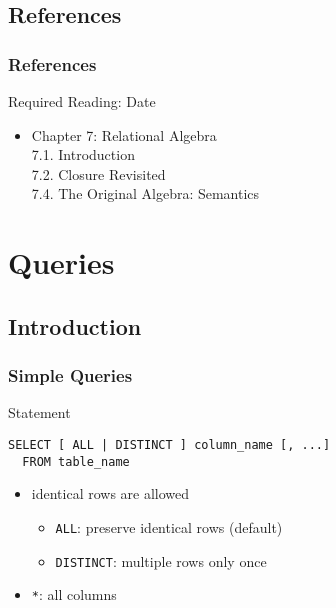 \documentclass[dvipsnames]{beamer}
\theoremstyle{plain}
\begin{document}
\subsection*{References}

\begin{frame}
  \frametitle{References}

  \begin{block}{Required Reading: Date}
    \begin{itemize}
      \item Chapter 7: Relational Algebra\\
        7.1. \alert{Introduction}\\
        7.2. \alert{Closure Revisited}\\
        7.4. \alert{The Original Algebra: Semantics}
    \end{itemize}
  \end{block}
\end{frame}

\lstset{language=FullSQL}

\section{Queries}

\subsection{Introduction}

\begin{frame}[fragile]
  \frametitle{Simple Queries}

  \begin{block}{Statement}
    \begin{lstlisting}
SELECT [ ALL | DISTINCT ] column_name [, ...]
  FROM table_name
    \end{lstlisting}
  \end{block}

  \pause
  \begin{itemize}
    \item identical rows are allowed
    \begin{itemize}
        \item \lstinline!ALL!: preserve identical rows (default)
        \item \lstinline!DISTINCT!: multiple rows only once
    \end{itemize}

    \pause
    \item \lstinline!*!: all columns
  \end{itemize}
\end{frame}
\end{document}
